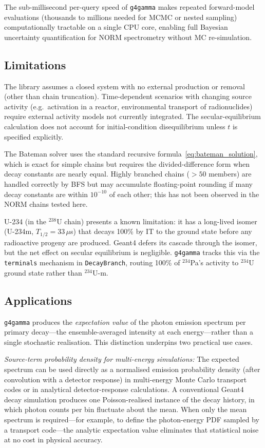 \documentclass[journal]{IEEEtran}
\begin{document}
The sub-millisecond per-query speed of \texttt{g4gamma} makes repeated
forward-model evaluations (thousands to millions needed for MCMC or nested
sampling) computationally tractable on a single CPU core, enabling full Bayesian
uncertainty quantification for NORM spectrometry without MC re-simulation.

\subsection{Limitations}

The library assumes a closed system with no external production or removal
(other than chain truncation).
Time-dependent scenarios with changing source activity (e.g.\ activation in a
reactor, environmental transport of radionuclides) require external activity
models not currently integrated.
The secular-equilibrium calculation does not account for initial-condition
disequilibrium unless $t$ is specified explicitly.

The Bateman solver uses the standard recursive formula~\eqref{eq:bateman_solution},
which is exact for simple chains but requires the divided-difference form when
decay constants are nearly equal.
Highly branched chains ($>50$ members) are handled correctly by BFS but may
accumulate floating-point rounding if many decay constants are within $10^{-10}$
of each other; this has not been observed in the NORM chains tested here.

U-234 (in the $^{238}$U chain) presents a known limitation: it has a long-lived
isomer (U-234m, $T_{1/2} = 33\,\mu$s) that decays 100\% by IT to the ground state
before any radioactive progeny are produced.
Geant4 defers its cascade through the isomer, but the net effect on secular
equilibrium is negligible.
\texttt{g4gamma} tracks this via the \texttt{terminals} mechanism in
\texttt{DecayBranch}, routing 100\% of $^{234}$Pa's activity to $^{234}$U
ground state rather than $^{234}$U-m.

\subsection{Applications}

\texttt{g4gamma} produces the \emph{expectation value} of the photon emission
spectrum per primary decay---the ensemble-averaged intensity at each energy---rather
than a single stochastic realisation.
This distinction underpins two practical use cases.

\textit{Source-term probability density for multi-energy simulations:}
The expected spectrum can be used directly as a normalised emission probability
density (after convolution with a detector response) in multi-energy Monte Carlo
transport codes or in analytical detector-response calculations.
A conventional Geant4 decay simulation produces one Poisson-realised instance of
the decay history, in which photon counts per bin fluctuate about the mean.
When only the mean spectrum is required---for example, to define the photon-energy
PDF sampled by a transport code---the analytic expectation value eliminates that
statistical noise at no cost in physical accuracy.
\end{document}
